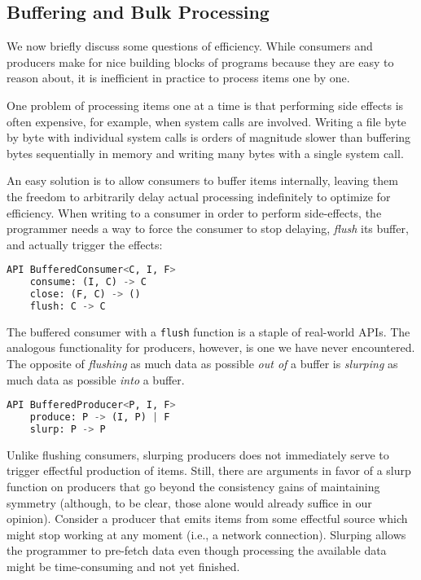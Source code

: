 \documentclass[sigplan,screen,10pt,anonymous,review]{acmart}
\begin{document}
\subsection{Buffering and Bulk Processing}\label{bulk}

We now briefly discuss some questions of efficiency. While consumers and producers make for nice building blocks of programs because they are easy to reason about, it is inefficient in practice to process items one by one.

One problem of processing items one at a time is that performing side effects is often expensive, for example, when system calls are involved. Writing a file byte by byte with individual system calls is orders of magnitude slower than buffering bytes sequentially in memory and writing many bytes with a single system call.

An easy solution is to allow consumers to buffer items internally, leaving them the freedom to arbitrarily delay actual processing indefinitely to optimize for efficiency. When writing to a consumer in order to perform side-effects, the programmer needs a way to force the consumer to stop delaying, \textit{flush} its buffer, and actually trigger the effects:

\begin{lstlisting}[language=Python]
API BufferedConsumer<C, I, F>
    consume: (I, C) -> C
    close: (F, C) -> ()
    flush: C -> C
\end{lstlisting}

The buffered consumer with a \texttt{flush} function is a staple of real-world APIs. The analogous functionality for producers, however, is one we have never encountered. The opposite of \textit{flushing} as much data as possible \textit{out of} a buffer is \textit{slurping} as much data as possible \textit{into} a buffer.

\begin{lstlisting}[language=Python]
API BufferedProducer<P, I, F>
    produce: P -> (I, P) | F
    slurp: P -> P
\end{lstlisting}

Unlike flushing consumers, slurping producers does not immediately serve to trigger effectful production of items. Still, there are arguments in favor of a slurp function on producers that go beyond the consistency gains of maintaining symmetry (although, to be clear, those alone would already suffice in our opinion). Consider a producer that emits items from some effectful source which might stop working at any moment (i.e., a network connection). Slurping allows the programmer to pre-fetch data even though processing the available data might be time-consuming and not yet finished.
\end{document}
